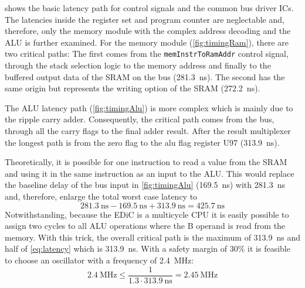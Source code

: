  shows the basic latency path for control signals and the common bus driver \glspl{IC}.
The latencies inside the register set and program counter are neglectable and, therefore, only the memory module with the complex address decoding and the \gls{ALU} is further examined.
For the memory module (\cref{fig:timingRam}), there are two critical paths:
The first comes from the \texttt{memInstrToRamAddr} control signal, through the stack selection logic to the memory address and finally to the buffered output data of the \gls{SRAM} on the bus (\qty{281.3}{\nano\second}).
The second has the same origin but represents the writing option of the \gls{SRAM} (\qty{272.2}{\nano\second}).

The \gls{ALU} latency path (\cref{fig:timingAlu}) is more complex which is mainly due to the ripple carry adder.
Consequently, the critical path comes from the bus, through all the carry flags to the final adder result.
After the result multiplexer the longest path is from the zero flag to the alu flag register U97 (\qty{313.9}{\nano\second}).

Theoretically, it is possible for one instruction to read a value from the \gls{SRAM} and using it in the same instruction as an input to the \gls{ALU}.
This would replace the baseline delay of the bus input in \cref{fig:timingAlu} (\qty{169.5}{\nano\second}) with \qty{281.3}{\nano\second} and, therefore, enlarge the total worst case latency to
\begin{equation}
  \qty{281.3}{\nano\second}-\qty{169.5}{\nano\second}+\qty{313.9}{\nano\second}=\qty{425.7}{\nano\second}\label{eq:latency}
\end{equation}
Notwithstanding, because the \gls{EDiC} is a multicycle \gls{CPU} it is easily possible to assign two cycles to all \gls{ALU} operations where the B operand is read from the memory.
With this trick, the overall critical path is the maximum of \qty{313.9}{\nano\second} and half of \cref{eq:latency} which is \qty{313.9}{\nano\second}.
With a safety margin of 30\% it is feasible to choose an oscillator with a frequency of \qty{2.4}{\mega\hertz}:
\begin{equation}
  \qty{2.4}{\mega\hertz}\leq\frac{1}{1.3\cdot\qty{313.9}{\nano\second}} =\qty{2.45}{\mega\hertz}
\end{equation}

